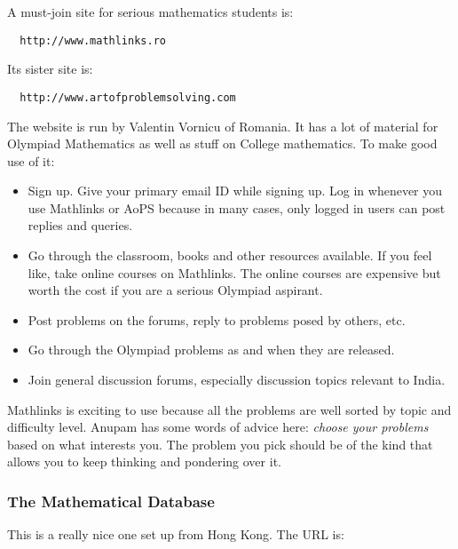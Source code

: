 \documentclass[a4paper]{amsart}
\begin{document}
A must-join site for serious mathematics students is:

\begin{verbatim}
  http://www.mathlinks.ro
\end{verbatim}

Its sister site is:

\begin{verbatim}
  http://www.artofproblemsolving.com
\end{verbatim}

The website is run by Valentin Vornicu of Romania. It has a lot of material for Olympiad Mathematics as well as stuff on College
mathematics.  To make good use of it:

\begin{itemize}

\item Sign up. Give your primary email ID while signing up. Log in whenever you use Mathlinks or AoPS because in many cases, only
  logged in users can post replies and queries.

\item Go through the classroom, books and other resources available. If you feel like, take online courses on Mathlinks. The online
  courses are expensive but worth the cost if you are a serious Olympiad aspirant.

\item Post problems on the forums, reply to problems posed by others, etc.

\item Go through the Olympiad problems as and when they are released.

\item Join general discussion forums, especially discussion topics relevant to India.

\end{itemize}

Mathlinks is exciting to use because all the problems are well sorted by topic and difficulty level. Anupam has some words
of advice here: {\em choose your problems} based on what interests you. The problem you pick should be of the kind that allows you to
keep thinking and pondering over it.

\subsubsection{The Mathematical Database}

This is a really nice one set up from Hong Kong. The URL is:
\end{document}
